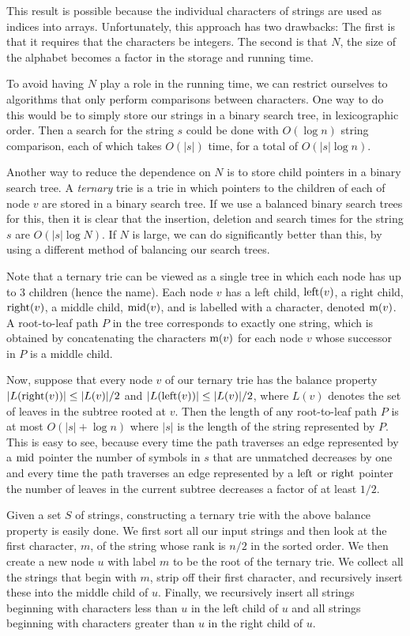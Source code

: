 This result is possible because the individual characters of strings
are used as indices into arrays.  Unfortunately, this approach has
two drawbacks: The first is that it requires that the characters be
integers.  The second is that $N$, the size of the alphabet becomes a
factor in the storage and running time.

To avoid having $N$ play a role in the running time, we can restrict
ourselves to algorithms that only perform comparisons between
characters.  One way to do this would be to simply store our strings
in a binary search tree, in lexicographic order.  Then a search for
the string $s$ could be done with $O(\log n)$ string comparison, each
of which takes $O(|s|)$ time, for a total of $O(|s|\log n)$.

Another way to reduce the dependence on $N$ is to store child pointers
in a binary search tree.  A \emph{ternary} trie is a trie in which
pointers to the children of each of node $v$ are stored in a binary
search tree.  If we use a balanced binary search trees for this, then it
is clear that the insertion, deletion and search times for the string
$s$ are $O(|s|\log N)$.  If $N$ is large, we can do significantly
better than this, by using a different method of balancing our search
trees.

Note that a ternary trie can be viewed as a single tree in which each
node has up to 3 children (hence the name).  Each node $v$ has a left
child, $\mathrm{left}(v)$, a right child, $\mathrm{right}(v)$, a middle child, $\mathrm{mid}(v)$,
and is labelled with a character, denoted $\mathrm{m}(v)$.  A root-to-leaf path
$P$ in the tree corresponds to exactly one string, which is obtained by
concatenating the characters $\mathrm{m}(v)$ for each node $v$ whose successor
in $P$ is a middle child.

Now, suppose that every node $v$ of our ternary trie has the balance
property $|L(\mathrm{right}(v))|\le |L(v)|/2$ and $|L(\mathrm{left}(v))|\le |L(v)|/2$,
where $L(v)$ denotes the set of leaves in the subtree rooted at $v$.
Then the length of any root-to-leaf path $P$ is at most $O(|s|+\log
n)$ where $|s|$ is the length of the string represented by $P$.  This
is easy to see, because every time the path traverses an edge
represented by a $\mathrm{mid}$ pointer the number of symbols in $s$ that are
unmatched decreases by one and every time the path traverses an edge
represented by a $\mathrm{left}$ or $\mathrm{right}$ pointer the number of leaves in the
current subtree decreases a factor of at least $1/2$.

Given a set $S$ of strings, constructing a ternary trie with the above
balance property is easily done.  We first sort all our input strings
and then look at the first character, $m$, of the string whose rank is
$n/2$ in the sorted order.  We then create a new node $u$ with label
$m$ to be the root of the ternary trie.  We collect all the strings
that begin with $m$, strip off their first character, and recursively
insert these into the middle child of $u$.  Finally, we recursively
insert all strings beginning with characters less than $u$ in the left
child of $u$ and all strings beginning with characters greater than
$u$ in the right child of $u$.

